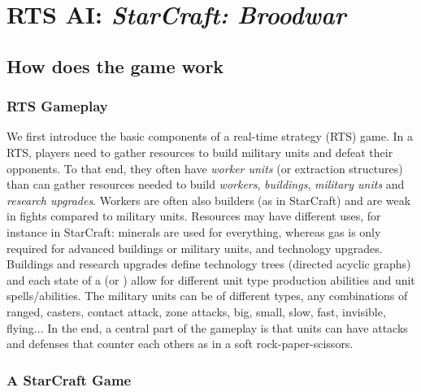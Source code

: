 \chapter{RTS AI: \textit{StarCraft: Broodwar}}

\section{How does the game work}

\subsection{RTS Gameplay}
We first introduce the basic components of a real-time strategy (RTS) game. In a RTS, players need to gather resources to build military units and defeat their opponents. To that end, they often have \textit{worker units} (or extraction structures) than can gather resources needed to build \textit{workers}, \textit{buildings}, \textit{military units} and \textit{research upgrades}. Workers are often also builders (as in StarCraft) and are weak in fights compared to military units. Resources may have different uses, for instance in StarCraft: minerals are used for everything, whereas gas is only required for advanced buildings or military units, and technology upgrades. Buildings and research upgrades define technology trees (directed acyclic graphs) and each state of a  (or ) allow for different unit type production abilities and unit spells/abilities. The military units can be of different types, any combinations of ranged, casters, contact attack, zone attacks, big, small, slow, fast, invisible, flying... In the end, a central part of the gameplay is that units can have attacks and defenses that counter each others as in a soft rock-paper-scissors. 

\subsection{A StarCraft Game}


